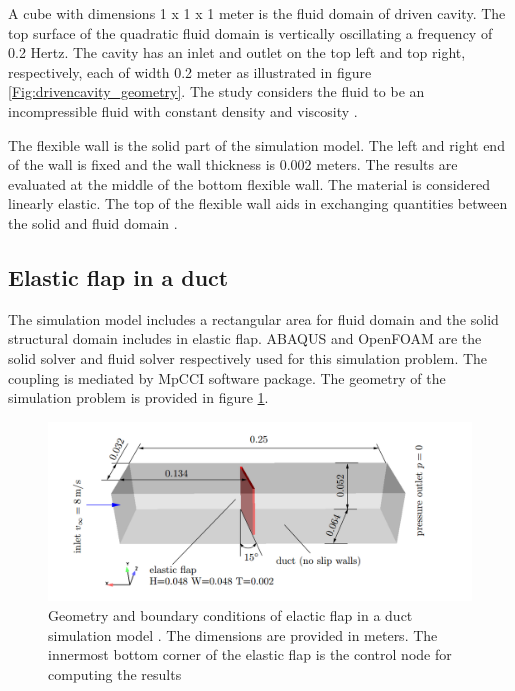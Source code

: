 A cube with dimensions 1 x 1 x 1 meter is the fluid domain of driven cavity. The top surface of the quadratic fluid domain is vertically oscillating a frequency of 0.2 Hertz. The cavity has an inlet and outlet on the top left and top right, respectively, each of width 0.2 meter as illustrated in figure \ref{Fig:drivencavity_geometry}.  The study considers the fluid to be an incompressible fluid with constant density and viscosity \cite{MpCCI_documentation}.


The flexible wall is the solid part of the simulation model. The left and right end of the wall is fixed and the wall thickness is 0.002 meters. The results are evaluated at the middle of the bottom flexible wall. The material is considered linearly elastic. The top of the flexible wall aids in exchanging quantities between the solid and fluid domain \cite{MpCCI_documentation}. 

\subsection{Elastic flap in a duct}
\label{section:elastic_flap}
The simulation model includes a rectangular area for fluid domain and the solid structural domain includes in elastic flap. ABAQUS and OpenFOAM are the solid solver and fluid solver respectively used for this simulation problem. The coupling is mediated by MpCCI software package. The geometry of the simulation problem is provided in figure \ref{Fig:elastic_flap}.

\begin{figure}[!ht]
\centering
\includegraphics[width=0.78\linewidth,height=0.33\textheight]{images/elasticflap_geometry.png}
\captionsetup{justification=justified}
\caption[Geometry of elastic flap simulation problem]{Geometry and boundary conditions of elactic flap in a duct simulation model \cite{MpCCI_documentation}. The dimensions are provided in meters. The innermost bottom corner of the elastic flap is the control node for computing the results}
\label{Fig:elastic_flap}
\end{figure}

